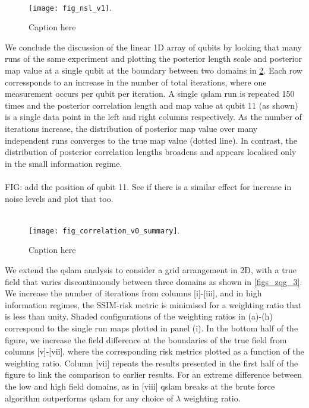 \\
\begin{figure}
	\texttt{[image: fig\_nsl\_v1]}. 
	\caption{\label{fig_nsl_v1} Caption here}    	
\end{figure}
We conclude the discussion of the linear 1D array of qubits by looking that many runs of the same experiment and plotting the posterior length scale and posterior map value at a single qubit at the boundary between two domains in \cref{fig_correlation_v0_summary}. Each row corressponds to an increase in the number of total iterations, where one measurement occurs per qubit per iteration. A single qslam run is repeated 150 times and the posterior correlation length and map value at qubit 11 (as shown) is a single data point in the left and right columns respectively. As the number of iterations increase, the distribution of posterior map value over many independent runs converges to the true map value (dotted line). In contrast, the distribution of posterior correlation lengths broadens  and appears localised only in the small information regime.\\
\\
FIG: add the position of qubit 11. See if there is a similar effect for increase in noise levels and plot that too. \\
\\
\begin{figure}
	\texttt{[image: fig\_correlation\_v0\_summary]}. 
	\caption{\label{fig_correlation_v0_summary} Caption here}    	
\end{figure}
We extend the qslam analysis to consider a grid arrangement in 2D, with a true field that varies discontinuously between three domains as shown in \cref{figs_zqg_3}. We increase the number of iterations from columns [i]-[iii], and in high information regimes, the SSIM-risk metric is minimised for a weighting ratio that is less than unity. Shaded configurations of the weighting ratios in (a)-(h) correspond to the single run maps plotted in panel (i). In the bottom half of the figure, we increase the field difference at the boundaries of the true field from columns [v]-[vii], where the corresponding risk metrics plotted as a function of the weighting ratio. Column [vii] repeats the results presented in the first half of the figure to link the comparison to earlier results. For an extreme difference between the low and high field domains, as in [viii] qslam breaks at the brute force algorithm outperforms qslam for any choice of $\lambda$ weighting ratio. \\
